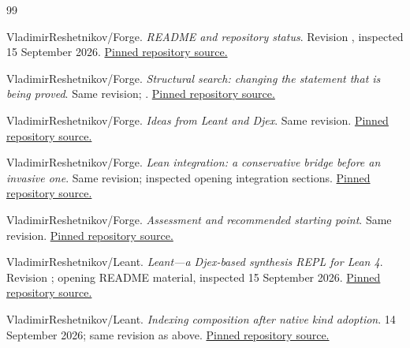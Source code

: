 \clearpage
\begin{thebibliography}{99}
\small\raggedright
\setlength{\itemsep}{0.35em}
\setlength{\parskip}{0pt}
VladimirReshetnikov/Forge. \emph{README and repository status}. Revision
, inspected 15 September 2026.
\href{https://github.com/VladimirReshetnikov/Forge/blob/674521027d968d59f7b83220ed52304a85cb55e2/README.md}{Pinned repository source.}

VladimirReshetnikov/Forge. \emph{Structural search: changing the statement that
is being proved}. Same revision; .
\href{https://github.com/VladimirReshetnikov/Forge/blob/674521027d968d59f7b83220ed52304a85cb55e2/article/sections/05-structural.tex}{Pinned repository source.}

VladimirReshetnikov/Forge. \emph{Ideas from Leant and Djex}. Same revision.
\href{https://github.com/VladimirReshetnikov/Forge/blob/674521027d968d59f7b83220ed52304a85cb55e2/docs/IDEAS-FROM-LEANT-DJEX.md}{Pinned repository source.}

VladimirReshetnikov/Forge. \emph{Lean integration: a conservative bridge before
an invasive one}. Same revision; inspected opening integration sections.
\href{https://github.com/VladimirReshetnikov/Forge/blob/674521027d968d59f7b83220ed52304a85cb55e2/article/sections/08-integration.tex}{Pinned repository source.}

VladimirReshetnikov/Forge. \emph{Assessment and recommended starting point}.
Same revision.
\href{https://github.com/VladimirReshetnikov/Forge/blob/674521027d968d59f7b83220ed52304a85cb55e2/article/sections/11-conclusion.tex}{Pinned repository source.}

VladimirReshetnikov/Leant. \emph{Leant---a Djex-based synthesis REPL for Lean 4}.
Revision ; opening README material,
inspected 15 September 2026.
\href{https://github.com/VladimirReshetnikov/Leant/blob/6bf05ad78c467989e68290f2d08bbed40802d485/README.md}{Pinned repository source.}

VladimirReshetnikov/Leant. \emph{Indexing composition after native kind adoption}.
14 September 2026; same revision as above.
\href{https://github.com/VladimirReshetnikov/Leant/blob/6bf05ad78c467989e68290f2d08bbed40802d485/docs/reports/2026-09-14-indexing-composition-diagnostics.md}{Pinned repository source.}


\end{thebibliography}
